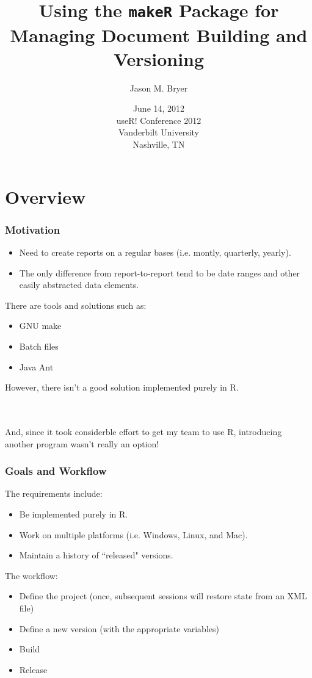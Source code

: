 \documentclass[10pt,slidestop,mathserif,c]{beamer}
\title[makeR Package]{Using the \texttt{makeR} Package for Managing Document Building and Versioning}
\subtitle{}
\author[Jason Bryer]{Jason M. Bryer}
\institute[jbryer.github.com]{University at Albany\\Excelsior College\\\url{jbryer.github.com/makeR}\\jason@bryer.org}
\date[useR! Conference - Jun 14, 2012]{June 14, 2012\\useR! Conference 2012\\Vanderbilt University\\Nashville, TN}
\begin{document}
\frame{\titlepage}

\section{Overview}

\begin{frame}[fragile]
	\frametitle{Motivation}
	\begin{itemize}
	\item Need to create reports on a regular bases (i.e. montly, quarterly, yearly).
	\item The only difference from report-to-report tend to be date ranges and other easily abstracted data elements.
	\end{itemize}
	\pause
	There are tools and solutions such as:
	\begin{itemize}
	\item GNU make
	\item Batch files
	\item Java Ant
	\end{itemize}
	
	\pause
	However, there isn't a good solution implemented purely in R.
	
	\pause
	\ \\ \ \\
	And, since it took considerble effort to get my team to use R, introducing another program wasn't really an option!
\end{frame}

\begin{frame}[fragile]
	\frametitle{Goals and Workflow}
	The requirements include:
	\begin{itemize}
		\item Be implemented purely in R.
		\item Work on multiple platforms (i.e. Windows, Linux, and Mac).
		\item Maintain a history of ``released" versions.
	\end{itemize}
	\pause
	The workflow:
	\begin{itemize}[<+-| alert@+>]
		\item Define the project (once, subsequent sessions will restore state from an XML file)
		\item Define a new version (with the appropriate variables)
		\item Build
		\item Release
	\end{itemize}
\end{frame}
\end{document}
